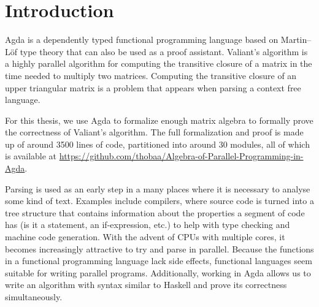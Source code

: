 \chapter{Introduction}
Agda is a dependently typed functional programming language based on Martin--Löf type theory that can also be used as a proof assistant. Valiant's algorithm is a highly parallel algorithm for computing the transitive closure of a matrix in the time needed to multiply two matrices. Computing the transitive closure of an upper triangular matrix is a problem that appears when parsing a context free language.

For this thesis, we use Agda to formalize enough matrix algebra to formally prove the correctness of Valiant's algorithm.
The full formalization and proof is made up of around 3500 lines of code, partitioned into around 30 modules, all of which is available at \url{https://github.com/thobaa/Algebra-of-Parallel-Programming-in-Agda}.

% 


Parsing is used as an early step in a many places where it is necessary to analyse some kind of text. Examples include compilers, where source code is turned into a tree structure that contains information about the properties a segment of code has (is it a statement, an if-expression, etc.) to help with type checking and machine code generation.
With the advent of CPUs with multiple cores, it becomes increasingly attractive to try and parse in parallel.
Because the functions in a functional programming language lack side effects, functional languages seem suitable for writing parallel programs.
Additionally, working in Agda allows us to write an algorithm with syntax similar to Haskell and prove its correctness simultaneously.

